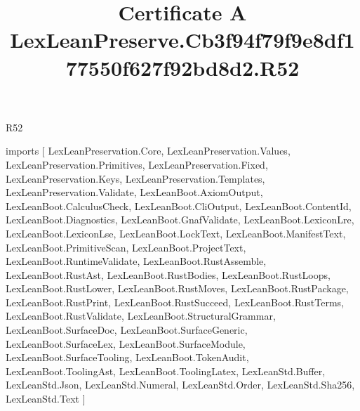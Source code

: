 \begin{lexlean}{R52}
\title{Certificate A LexLeanPreserve.Cb3f94f79f9e8df177550f627f92bd8d2.R52}
\begin{coremodule}
imports [
  LexLeanPreservation.Core,
  LexLeanPreservation.Values,
  LexLeanPreservation.Primitives,
  LexLeanPreservation.Fixed,
  LexLeanPreservation.Keys,
  LexLeanPreservation.Templates,
  LexLeanPreservation.Validate,
  LexLeanBoot.AxiomOutput,
  LexLeanBoot.CalculusCheck,
  LexLeanBoot.CliOutput,
  LexLeanBoot.ContentId,
  LexLeanBoot.Diagnostics,
  LexLeanBoot.GnafValidate,
  LexLeanBoot.LexiconLre,
  LexLeanBoot.LexiconLse,
  LexLeanBoot.LockText,
  LexLeanBoot.ManifestText,
  LexLeanBoot.PrimitiveScan,
  LexLeanBoot.ProjectText,
  LexLeanBoot.RuntimeValidate,
  LexLeanBoot.RustAssemble,
  LexLeanBoot.RustAst,
  LexLeanBoot.RustBodies,
  LexLeanBoot.RustLoops,
  LexLeanBoot.RustLower,
  LexLeanBoot.RustMoves,
  LexLeanBoot.RustPackage,
  LexLeanBoot.RustPrint,
  LexLeanBoot.RustSucceed,
  LexLeanBoot.RustTerms,
  LexLeanBoot.RustValidate,
  LexLeanBoot.StructuralGrammar,
  LexLeanBoot.SurfaceDoc,
  LexLeanBoot.SurfaceGeneric,
  LexLeanBoot.SurfaceLex,
  LexLeanBoot.SurfaceModule,
  LexLeanBoot.SurfaceTooling,
  LexLeanBoot.TokenAudit,
  LexLeanBoot.ToolingAst,
  LexLeanBoot.ToolingLatex,
  LexLeanStd.Buffer,
  LexLeanStd.Json,
  LexLeanStd.Numeral,
  LexLeanStd.Order,
  LexLeanStd.Sha256,
  LexLeanStd.Text
]


\end{coremodule}
\end{lexlean}
